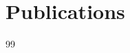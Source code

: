 \chapter*{Publications}

\begin{refsection}[ownpubs]
    \small
    \nocite{*} %
    { %
      \expandafter\def\csname blx@maxbibnames\endcsname{99}%
      \printbibliography[heading=none]
    }
\end{refsection}

